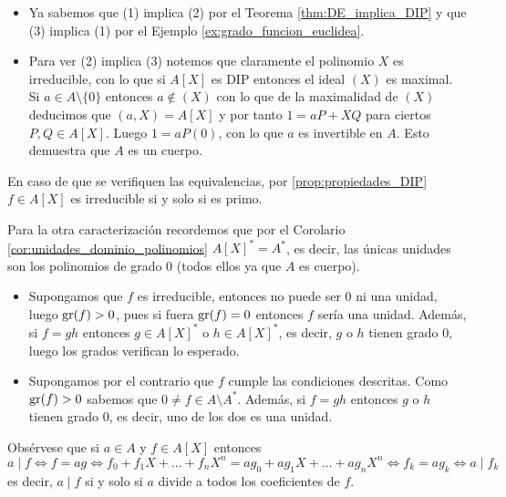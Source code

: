 \begin{proofbox}

\begin{itemize}
\item Ya sabemos que (1) implica (2) por el Teorema \ref{thm:DE_implica_DIP} y que (3) implica (1) por el Ejemplo \ref{ex:grado_funcion_euclidea}.

\item Para ver (2) implica (3) notemos que claramente el polinomio $X$ es irreducible, con lo que si $A[X]$ es DIP entonces el ideal $(X)$ es maximal. Si $a \in A \setminus \{0\}$ entonces $a \notin (X)$ con lo que de la maximalidad de $(X)$ deducimos que $(a, X) = A[X]$ y por tanto $1 = aP + XQ$ para ciertos $P, Q \in A[X]$. Luego $1 = aP(0)$, con lo que $a$ es invertible en $A$. Esto demuestra que $A$ es un cuerpo.
\end{itemize}

En caso de que se verifiquen las equivalencias, por \ref{prop:propiedades_DIP} $f \in A[X]$ es irreducible si y solo si es primo.

Para la otra caracterización recordemos que por el Corolario \ref{cor:unidades_dominio_polinomios} $A[X]^* = A^*$, es decir, las únicas unidades son los polinomios de grado $0$ (todos ellos ya que $A$ es cuerpo).

\begin{itemize}
\item Supongamos que $f$ es irreducible, entonces no puede ser 0 ni una unidad, luego $\operatorname{gr}(f) > 0$, pues si fuera $\operatorname{gr}(f) = 0$ entonces $f$ sería una unidad. Además, si $f = gh$ entonces $g \in A[X]^*$ o $h \in A[X]^*$, es decir, $g$ o $h$ tienen grado 0, luego los grados verifican lo esperado.

\item Supongamos por el contrario que $f$ cumple las condiciones descritas. Como $\operatorname{gr}(f) > 0$ sabemos que $0 \neq f \in A \setminus A^*$. Además, si $f = gh$ entonces $g$ o $h$ tienen grado 0, es decir, uno de los dos es una unidad.
\end{itemize}

\end{proofbox}

Obsérvese que si $a \in A$ y $f \in A[X]$ entonces
\[
a \mid f \iff f = ag \iff f_0 + f_1X + \dots + f_nX^n = ag_0 + ag_1X + \dots + ag_nX^n \iff f_k = a g_k \iff a \mid f_k
\]
es decir, $a \mid f$ si y solo si $a$ divide a todos los coeficientes de $f$.

